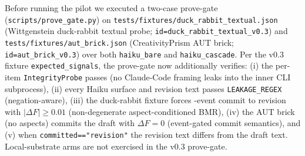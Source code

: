 Before running the pilot we executed a two-case prove-gate (\texttt{scripts/prove\_gate.py}) on \texttt{tests/fixtures/duck\_rabbit\_textual.json} (Wittgenstein duck-rabbit textual probe; \texttt{id=duck\_rabbit\_textual\_v0.3}) and \texttt{tests/fixtures/aut\_brick.json} (CreativityPrism AUT brick; \texttt{id=aut\_brick\_v0.3}) over both \texttt{haiku\_bare} and \texttt{haiku\_cascade}. Per the v0.3 fixture \texttt{expected\_signals}, the prove-gate now additionally verifies: (i) the per-item \texttt{IntegrityProbe} passes (no Claude-Code framing leaks into the inner CLI subprocess), (ii) every Haiku surface and revision text passes \texttt{LEAKAGE\_REGEX} (negation-aware), (iii) the duck-rabbit fixture forces -event commit to revision with $|\Delta F| \geq 0.01$ (non-degenerate aspect-conditioned BMR), (iv) the AUT brick (no aspects) commits the draft with $\Delta F = 0$ (event-gated commit semantics), and (v) when \texttt{committed=="revision"} the revision text differs from the draft text. Local-substrate arms are not exercised in the v0.3 prove-gate.
